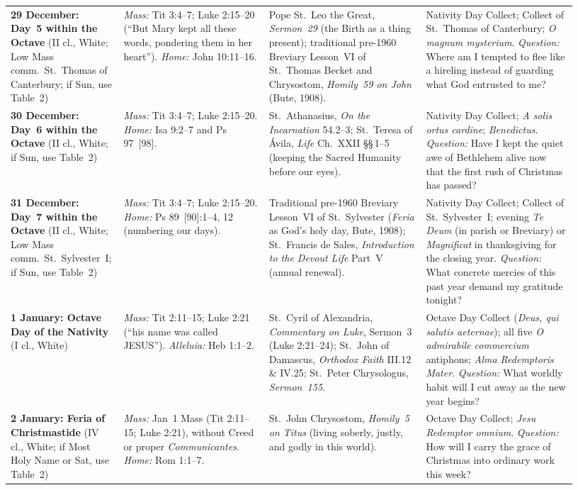 {\begin{longtable}{>{\raggedright\arraybackslash}p{0.15\linewidth}>{\raggedright\arraybackslash}p{0.25\linewidth}>{\raggedright\arraybackslash}p{0.27\linewidth}>{\raggedright\arraybackslash}p{0.26\linewidth}}
\textbf{29 December: Day~5 within the Octave} (II cl., White; Low Mass comm.\ St.~Thomas of Canterbury; if Sun, use Table~2) & \textit{Mass:} Tit 3:4--7; Luke 2:15--20 (``But Mary kept all these words, pondering them in her heart''). \textit{Home:} John 10:11--16. & Pope St.~Leo the Great, \textit{Sermon~29} (the Birth as a thing present); traditional pre-1960 Breviary Lesson~VI of St.~Thomas Becket and Chrysostom, \textit{Homily~59 on John} (Bute, 1908). & Nativity Day Collect; Collect of St.~Thomas of Canterbury; \textit{O magnum mysterium}. \textit{Question:} Where am I tempted to flee like a hireling instead of guarding what God entrusted to me?\\
\textbf{30 December: Day~6 within the Octave} (II cl., White; if Sun, use Table~2) & \textit{Mass:} Tit 3:4--7; Luke 2:15--20. \textit{Home:} Isa 9:2--7 and Ps 97~[98]. & St.~Athanasius, \textit{On the Incarnation} 54.2--3; St.~Teresa of \'Avila, \textit{Life} Ch.~XXII \S\S\,1--5 (keeping the Sacred Humanity before our eyes). & Nativity Day Collect; \textit{A solis ortus cardine}; \textit{Benedictus}. \textit{Question:} Have I kept the quiet awe of Bethlehem alive now that the first rush of Christmas has passed?\\
\textbf{31 December: Day~7 within the Octave} (II cl., White; Low Mass comm.\ St.~Sylvester~I; if Sun, use Table~2) & \textit{Mass:} Tit 3:4--7; Luke 2:15--20. \textit{Home:} Ps 89~[90]:1--4, 12 (numbering our days). & Traditional pre-1960 Breviary Lesson~VI of St.~Sylvester (\textit{Feria} as God's holy day, Bute, 1908); St.~Francis de Sales, \textit{Introduction to the Devout Life} Part~V (annual renewal). & Nativity Day Collect; Collect of St.~Sylvester~I; evening \textit{Te Deum} (in parish or Breviary) or \textit{Magnificat} in thanksgiving for the closing year. \textit{Question:} What concrete mercies of this past year demand my gratitude tonight?\\
\textbf{1 January: Octave Day of the Nativity} (I cl., White) & \textit{Mass:} Tit 2:11--15; Luke 2:21 (``his name was called JESUS''). \textit{Alleluia:} Heb 1:1--2. & St.~Cyril of Alexandria, \textit{Commentary on Luke}, Sermon~3 (Luke 2:21--24); St.~John of Damascus, \textit{Orthodox Faith} III.12 \& IV.25; St.~Peter Chrysologus, \textit{Sermon~155}. & Octave Day Collect (\textit{Deus, qui salutis aeternae}); all five \textit{O admirabile commercium} antiphons; \textit{Alma Redemptoris Mater}. \textit{Question:} What worldly habit will I cut away as the new year begins?\\
\textbf{2 January: Feria of Christmastide} (IV cl., White; if Most Holy Name or Sat, use Table~2) & \textit{Mass:} Jan~1 Mass (Tit 2:11--15; Luke 2:21), without Creed or proper \textit{Communicantes}. \textit{Home:} Rom 1:1--7. & St.~John Chrysostom, \textit{Homily~5 on Titus} (living soberly, justly, and godly in this world). & Octave Day Collect; \textit{Jesu Redemptor omnium}. \textit{Question:} How will I carry the grace of Christmas into ordinary work this week?\\

\end{longtable}}
